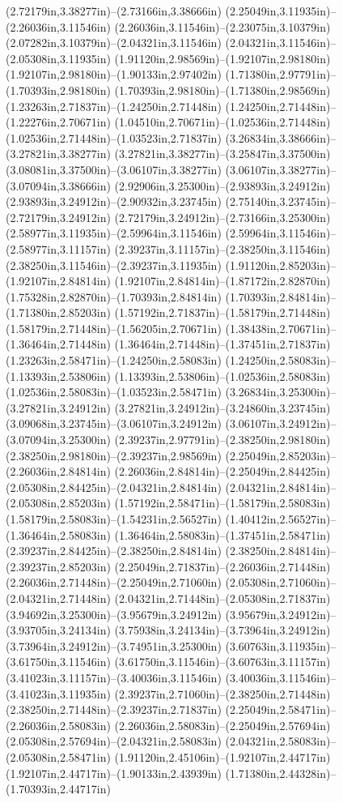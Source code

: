 (2.72179in,3.38277in)--(2.73166in,3.38666in) (2.25049in,3.11935in)--(2.26036in,3.11546in) (2.26036in,3.11546in)--(2.23075in,3.10379in) (2.07282in,3.10379in)--(2.04321in,3.11546in) (2.04321in,3.11546in)--(2.05308in,3.11935in) (1.91120in,2.98569in)--(1.92107in,2.98180in) (1.92107in,2.98180in)--(1.90133in,2.97402in) (1.71380in,2.97791in)--(1.70393in,2.98180in) (1.70393in,2.98180in)--(1.71380in,2.98569in) (1.23263in,2.71837in)--(1.24250in,2.71448in) (1.24250in,2.71448in)--(1.22276in,2.70671in) (1.04510in,2.70671in)--(1.02536in,2.71448in) (1.02536in,2.71448in)--(1.03523in,2.71837in) (3.26834in,3.38666in)--(3.27821in,3.38277in) (3.27821in,3.38277in)--(3.25847in,3.37500in) (3.08081in,3.37500in)--(3.06107in,3.38277in) (3.06107in,3.38277in)--(3.07094in,3.38666in) (2.92906in,3.25300in)--(2.93893in,3.24912in) (2.93893in,3.24912in)--(2.90932in,3.23745in) (2.75140in,3.23745in)--(2.72179in,3.24912in) (2.72179in,3.24912in)--(2.73166in,3.25300in) (2.58977in,3.11935in)--(2.59964in,3.11546in) (2.59964in,3.11546in)--(2.58977in,3.11157in) (2.39237in,3.11157in)--(2.38250in,3.11546in) (2.38250in,3.11546in)--(2.39237in,3.11935in) (1.91120in,2.85203in)--(1.92107in,2.84814in) (1.92107in,2.84814in)--(1.87172in,2.82870in) (1.75328in,2.82870in)--(1.70393in,2.84814in) (1.70393in,2.84814in)--(1.71380in,2.85203in) (1.57192in,2.71837in)--(1.58179in,2.71448in) (1.58179in,2.71448in)--(1.56205in,2.70671in) (1.38438in,2.70671in)--(1.36464in,2.71448in) (1.36464in,2.71448in)--(1.37451in,2.71837in) (1.23263in,2.58471in)--(1.24250in,2.58083in) (1.24250in,2.58083in)--(1.13393in,2.53806in) (1.13393in,2.53806in)--(1.02536in,2.58083in) (1.02536in,2.58083in)--(1.03523in,2.58471in) (3.26834in,3.25300in)--(3.27821in,3.24912in) (3.27821in,3.24912in)--(3.24860in,3.23745in) (3.09068in,3.23745in)--(3.06107in,3.24912in) (3.06107in,3.24912in)--(3.07094in,3.25300in) (2.39237in,2.97791in)--(2.38250in,2.98180in) (2.38250in,2.98180in)--(2.39237in,2.98569in) (2.25049in,2.85203in)--(2.26036in,2.84814in) (2.26036in,2.84814in)--(2.25049in,2.84425in) (2.05308in,2.84425in)--(2.04321in,2.84814in) (2.04321in,2.84814in)--(2.05308in,2.85203in) (1.57192in,2.58471in)--(1.58179in,2.58083in) (1.58179in,2.58083in)--(1.54231in,2.56527in) (1.40412in,2.56527in)--(1.36464in,2.58083in) (1.36464in,2.58083in)--(1.37451in,2.58471in) (2.39237in,2.84425in)--(2.38250in,2.84814in) (2.38250in,2.84814in)--(2.39237in,2.85203in) (2.25049in,2.71837in)--(2.26036in,2.71448in) (2.26036in,2.71448in)--(2.25049in,2.71060in) (2.05308in,2.71060in)--(2.04321in,2.71448in) (2.04321in,2.71448in)--(2.05308in,2.71837in) (3.94692in,3.25300in)--(3.95679in,3.24912in) (3.95679in,3.24912in)--(3.93705in,3.24134in) (3.75938in,3.24134in)--(3.73964in,3.24912in) (3.73964in,3.24912in)--(3.74951in,3.25300in) (3.60763in,3.11935in)--(3.61750in,3.11546in) (3.61750in,3.11546in)--(3.60763in,3.11157in) (3.41023in,3.11157in)--(3.40036in,3.11546in) (3.40036in,3.11546in)--(3.41023in,3.11935in) (2.39237in,2.71060in)--(2.38250in,2.71448in) (2.38250in,2.71448in)--(2.39237in,2.71837in) (2.25049in,2.58471in)--(2.26036in,2.58083in) (2.26036in,2.58083in)--(2.25049in,2.57694in) (2.05308in,2.57694in)--(2.04321in,2.58083in) (2.04321in,2.58083in)--(2.05308in,2.58471in) (1.91120in,2.45106in)--(1.92107in,2.44717in) (1.92107in,2.44717in)--(1.90133in,2.43939in) (1.71380in,2.44328in)--(1.70393in,2.44717in) 
